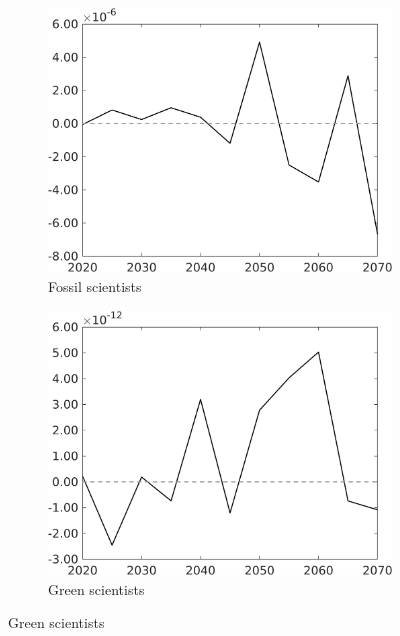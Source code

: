 \begin{figure}[h!!!]
\begin{subfigure}{0.4\textwidth}
	\end{subfigure}
	\begin{subfigure}{0.4\textwidth}
		\caption{Fossil scientists}
		\includegraphics[width=1\textwidth]{../../codding_model/own_basedOnFried/optimalPol_010922_revision/figures/all_13Sept22_Tplus30/CountTAUFPerDif_Opt_target_sff_nsk1_xgr0_knspil0_regime4_spillover0_sep0_extern0_PV1_etaa0.79.png}
	\end{subfigure}
	\begin{subfigure}{0.4\textwidth}
		\caption{Green scientists}
		\includegraphics[width=1\textwidth]{../../codding_model/own_basedOnFried/optimalPol_010922_revision/figures/all_13Sept22_Tplus30/CountTAUFPerDif_Opt_target_sg_nsk1_xgr0_knspil0_regime4_spillover0_sep0_extern0_PV1_etaa0.79.png}

\end{subfigure}
\end{figure}
